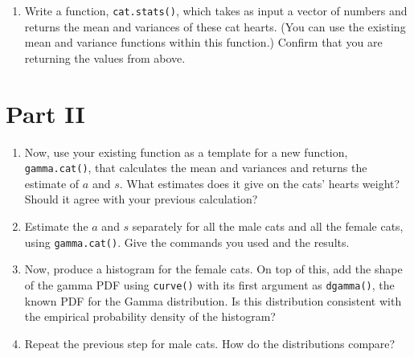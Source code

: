 \documentclass[
]{article}
\providecommand{\tightlist}{%
  \setlength{\itemsep}{0pt}\setlength{\parskip}{0pt}}
\begin{document}
\begin{enumerate}
\def\labelenumi{\arabic{enumi}.}
\setcounter{enumi}{4}
\tightlist
\item
  Write a function, \texttt{cat.stats()}, which takes as input a vector
  of numbers and returns the mean and variances of these cat hearts.
  (You can use the existing mean and variance functions within this
  function.) Confirm that you are returning the values from above.
\end{enumerate}

\hypertarget{part-ii}{%
\section{Part II}\label{part-ii}}

\begin{enumerate}
\def\labelenumi{\arabic{enumi}.}
\setcounter{enumi}{5}
\item
  Now, use your existing function as a template for a new function,
  \texttt{gamma.cat()}, that calculates the mean and variances and
  returns the estimate of \(a\) and \(s\). What estimates does it give
  on the cats' hearts weight? Should it agree with your previous
  calculation?
\item
  Estimate the \(a\) and \(s\) separately for all the male cats and all
  the female cats, using \texttt{gamma.cat()}. Give the commands you
  used and the results.
\item
  Now, produce a histogram for the female cats. On top of this, add the
  shape of the gamma PDF using \texttt{curve()} with its first argument
  as \texttt{dgamma()}, the known PDF for the Gamma distribution. Is
  this distribution consistent with the empirical probability density of
  the histogram?
\item
  Repeat the previous step for male cats. How do the distributions
  compare?
\end{enumerate}
\end{document}
